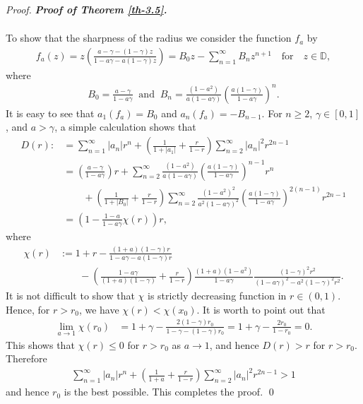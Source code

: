 \documentclass[a4paper,12pt]{amsart}
\theoremstyle{plain}
\theoremstyle{definition}
\newenvironment{pf}[1][]{%
 \vskip 3mm
 \noindent
 \ifthenelse{\equal{#1}{}}%
  {{\slshape Proof. }}%
  {{\slshape #1.} }%
 }%
{\qed\bigskip}
\begin{document}
\begin{pf}[\bf Proof of Theorem \ref{th-3.5}]
\begin{align*}
\end{align*}
To show that the sharpness of the radius we consider the function $ f_a $ by 
\begin{align*}
	f_a(z)=z\left(\frac{a-\gamma-(1-\gamma)z}{1-a\gamma-a(1-\gamma)z}\right)=B_0z-\sum_{n=1}^{\infty}B_nz^{n+1}\quad\mbox{for}\quad z\in\mathbb{D},
\end{align*}
where 
\begin{align*}
	B_0=\frac{a-\gamma}{1-a\gamma}\;\; \text{and}\;\; B_n=\frac{(1-a^2)}{a(1-a\gamma)}\left(\frac{a(1-\gamma)}{1-a\gamma}\right)^n.
\end{align*}
It is easy to see that $ a_1(f_a)=B_0 $ and $ a_n(f_a)=-B_{n-1} $. For $ n\geq 2 $, $ \gamma\in [0,1] $, and $ a>\gamma $, a simple calculation shows that 
\begin{align*}
	D(r):&=\sum_{n=1}^{\infty}|a_n|r^n+\left(\frac{1}{1+|a_1|}+\frac{r}{1-r}\right)\sum_{n=2}^{\infty}|a_n|^2r^{2n-1}\\&= \left(\frac{a-\gamma}{1-a\gamma}\right)r+\sum_{n=2}^{\infty}\frac{(1-a^2)}{a(1-a\gamma)}\left(\frac{a(1-\gamma)}{1-a\gamma}\right)^{n-1}r^n\\&\quad\quad+\left(\frac{1}{1+|B_0|}+\frac{r}{1-r}\right)\sum_{n=2}^{\infty}\frac{(1-a^2)^2}{a^2(1-a\gamma)^2}\left(\frac{a(1-\gamma)}{1-a\gamma}\right)^{2(n-1)}r^{2n-1}\\&=\left(1-\frac{1-a}{1-a\gamma}\chi(r)\right)r,
\end{align*}
where
\begin{align*}
	\chi(r)&:=1+r-\frac{(1+a)(1-\gamma)r}{1-a\gamma-a(1-\gamma)r}\\&\quad\quad-\left(\frac{1-a\gamma}{(1+a)(1-\gamma)}+\frac{r}{1-r}\right)\frac{(1+a)(1-a^2)}{1-a\gamma}\frac{(1-\gamma)^2r^2}{(1-a\gamma)^2-a^2(1-\gamma)^2r^2}.
\end{align*}
It is not difficult to show that $ \chi $ is strictly decreasing function in $ r\in (0,1) $. Hence, for $ r>r_0 $, we have $ \chi(r)<\chi(x_0) $. It is worth to point out that 
\begin{align*}
	\lim_{a\rightarrow 1}\chi(r_0)&=1+\gamma-\frac{2(1-\gamma)r_0}{1-\gamma-(1-\gamma)r_0}=1+\gamma-\frac{2r_0}{1-r_0}=0.
\end{align*}
This shows that $ \chi(r)\leq 0 $ for $ r>r_0 $ as $ a\rightarrow 1 $, and hence $ D(r)>r $ for $ r>r_0 $. Therefore
\begin{align*}
		\sum_{n=1}^{\infty}|a_n|r^n+\left(\frac{1}{1+a}+\frac{r}{1-r}\right)\sum_{n=2}^{\infty}|a_n|^2r^{2n-1}>1
\end{align*}
and hence $ r_0 $ is the best possible. This completes the proof.
\end{pf}
\end{document}
